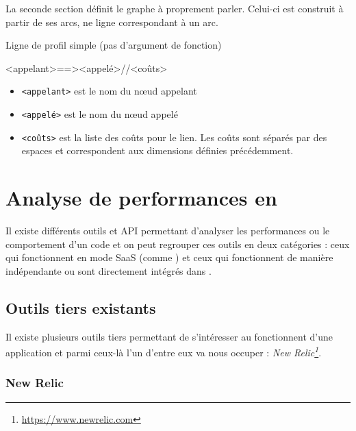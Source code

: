 La seconde section définit le graphe à proprement parler. Celui-ci est construit à partir de ses arcs, ne ligne correspondant à un arc.

\begin{listing}[H]
\caption{Ligne de profil simple (pas d'argument de fonction)}
\begin{textcode}
<appelant>==><appelé>//<coûts>
\end{textcode}
\end{listing}

\begin{itemize}
\item \verb|<appelant>| est le nom du nœud appelant
\item \verb|<appelé>| est le nom du nœud appelé
\item \verb|<coûts>| est la liste des coûts pour le lien. Les coûts sont séparés par des espaces et correspondent aux dimensions définies précédemment.
\end{itemize}

	\chapter[Analyse en \Python]{Analyse de performances en \Python}
Il existe différents outils et API permettant d'analyser les performances ou le comportement d'un code \Python et on peut regrouper ces outils en deux catégories : ceux qui fonctionnent en mode \gls{SaaS} (comme \Blackfire) et ceux qui fonctionnent de manière indépendante ou sont directement intégrés dans \Python.

		\section{Outils tiers existants}
Il existe plusieurs outils tiers permettant de s'intéresser au fonctionnent d'une application \Python et parmi ceux-là l'un d'entre eux va nous occuper : \emph{New Relic\footnote{\url{https://www.newrelic.com}}}. %

			\subsection{New Relic}
          		
			
